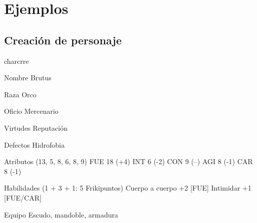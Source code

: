 \chapter{Ejemplos}

\section{Creación de personaje}

\begin{labeling}{charcrre}
\item [Nombre] Brutus
\item [Raza] Orco
\item [Oficio] Mercenario
\item [Virtudes] Reputación
\item [Defectos] Hidrofobia
\item [Atributos] (13, 5, 8, 6, 8, 9) \linebreak
FUE 18 (+4)\linebreak
INT 6  (-2)\linebreak
CON 9  (--)\linebreak
AGI 8  (-1)\linebreak
CAR 8  (-1)\linebreak
\item [Habilidades] (1 + 3 + 1: 5 Frikipuntos)\linebreak
Cuerpo a cuerpo +2 [FUE]\linebreak
Intimidar +1 [FUE/CAR]
\item [Equipo] Escudo, mandoble, armadura
\end{labeling}
